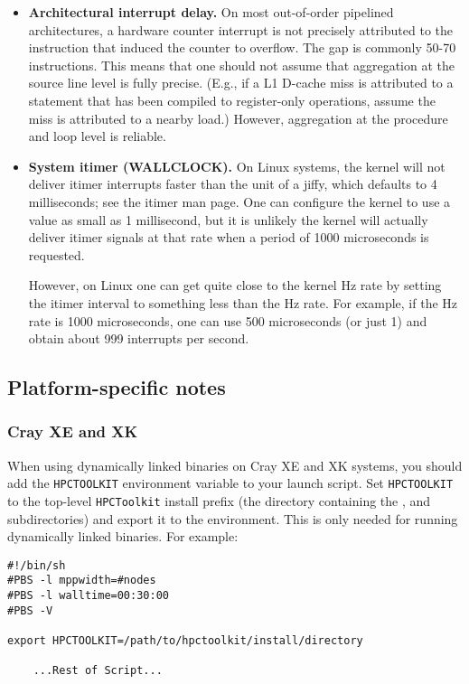 \documentclass[english]{article}
\begin{document}
\begin{itemize}
\item \textbf{Architectural interrupt delay.}
On most out-of-order pipelined architectures, a hardware counter interrupt is not precisely attributed to the instruction that induced the counter to overflow.
The gap is commonly 50-70 instructions.
This means that one should not assume that aggregation at the source line level is fully precise.
(E.g., if a L1 D-cache miss is attributed to a statement that has been compiled to register-only operations, assume the miss is attributed to a nearby load.)
However, aggregation at the procedure and loop level is reliable.

\item \textbf{System itimer (WALLCLOCK).}
On Linux systems, the kernel will not deliver itimer interrupts faster than the unit of a jiffy, which defaults to 4 milliseconds; see the itimer man page.
One can configure the kernel to use a value as small as 1 millisecond, but it is unlikely the kernel will actually deliver itimer signals at that rate when a period of 1000 microseconds is requested.

However, on Linux one can get quite close to the kernel Hz rate by setting the itimer interval to something less than the Hz rate.
For example, if the Hz rate is 1000 microseconds, one can use 500 microseconds (or just 1) and obtain about 999 interrupts per second.
\end{itemize}

\subsection{Platform-specific notes}
\subsubsection{Cray XE and XK}
When using dynamically linked binaries on Cray XE and XK systems, you
should add the \verb+HPCTOOLKIT+ environment variable to your launch
script.  Set \verb+HPCTOOLKIT+ to the top-level \verb+HPCToolkit+ install
prefix (the directory containing the ,  and
 subdirectories) and export it to the environment.  This is
only needed for running dynamically linked binaries.  For example:

\begin{verbatim}
#!/bin/sh
#PBS -l mppwidth=#nodes
#PBS -l walltime=00:30:00
#PBS -V

export HPCTOOLKIT=/path/to/hpctoolkit/install/directory

    ...Rest of Script...
\end{verbatim}
\end{document}
